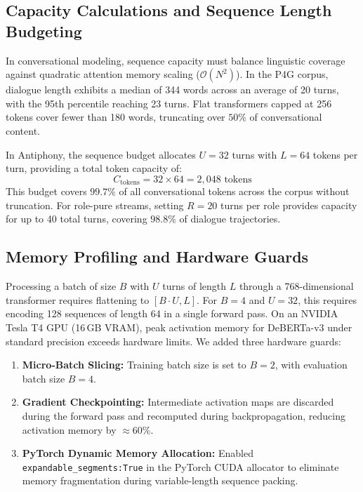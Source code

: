 \subsection{Capacity Calculations and Sequence Length Budgeting}
In conversational modeling, sequence capacity must balance linguistic coverage against quadratic attention memory scaling ($\mathcal{O}(N^2)$). In the P4G corpus, dialogue length exhibits a median of 344 words across an average of 20 turns, with the 95th percentile reaching 23 turns. Flat transformers capped at 256 tokens cover fewer than 180 words, truncating over $50\%$ of conversational content. 

In Antiphony, the sequence budget allocates $U=32$ turns with $L=64$ tokens per turn, providing a total token capacity of:
\begin{equation}
  C_{\text{tokens}} = 32 \times 64 = 2{,}048 \text{ tokens}
\end{equation}
This budget covers $99.7\%$ of all conversational tokens across the corpus without truncation. For role-pure streams, setting $R=20$ turns per role provides capacity for up to 40 total turns, covering $98.8\%$ of dialogue trajectories.

\subsection{Memory Profiling and Hardware Guards}
Processing a batch of size $B$ with $U$ turns of length $L$ through a 768-dimensional transformer requires flattening to $[B \cdot U, L]$. For $B=4$ and $U=32$, this requires encoding 128 sequences of length 64 in a single forward pass. On an NVIDIA Tesla T4 GPU (16\,GB VRAM), peak activation memory for DeBERTa-v3 under standard precision exceeds hardware limits. We added three hardware guards:
\begin{enumerate}
  \item \textbf{Micro-Batch Slicing:} Training batch size is set to $B=2$, with evaluation batch size $B=4$.
  \item \textbf{Gradient Checkpointing:} Intermediate activation maps are discarded during the forward pass and recomputed during backpropagation, reducing activation memory by $\approx 60\%$.
  \item \textbf{PyTorch Dynamic Memory Allocation:} Enabled \texttt{expandable\_segments:True} in the PyTorch CUDA allocator to eliminate memory fragmentation during variable-length sequence packing.
\end{enumerate}

